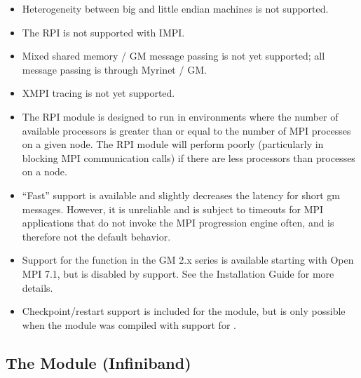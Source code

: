 \begin{itemize}
\item Heterogeneity between big and little endian machines is not
  supported.
  
\item The  RPI is not supported with IMPI.
  
\item Mixed shared memory / GM message passing is not yet supported;
  all message passing is through Myrinet / GM.
  
\item XMPI tracing is not yet supported.

  
\item The  RPI module is designed to run in environments where
  the number of available processors is greater than or equal to the
  number of MPI processes on a given node.  The  RPI module
  will perform poorly (particularly in blocking MPI communication
  calls) if there are less processors than processes on a node.



\item ``Fast'' support is available and slightly decreases the latency
  for short gm messages.  However, it is unreliable and is subject to
  timeouts for MPI applications that do not invoke the MPI progression
  engine often, and is therefore not the default behavior.

\item Support for the  function in the GM 2.x series
  is available starting with Open MPI 7.1, but is disabled by support.
  See the Installation Guide for more details.
  
\item Checkpoint/restart support is included for the  module,
  but is only possible when the  module was compiled with
  support for .


\end{itemize}


\subsection{The  Module (Infiniband)}
\label{sec:mca-ompi-ib}

